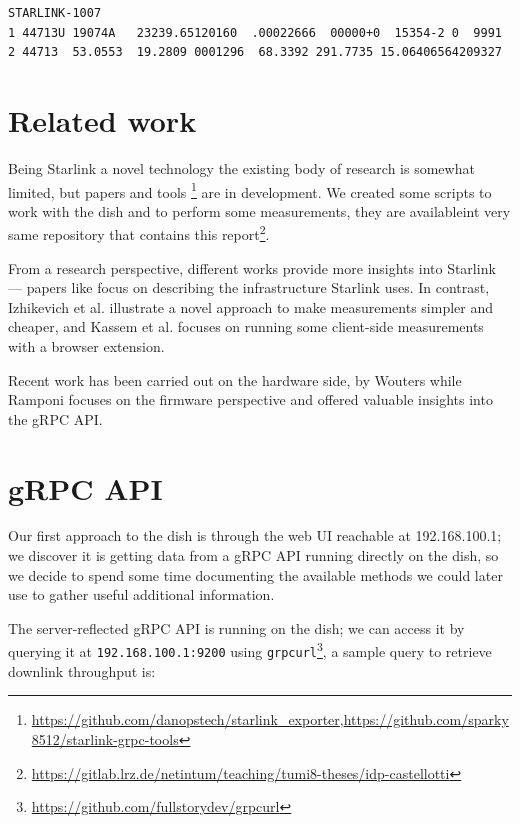 \documentclass[IN,11pt,twoside,openright,idp,english]{tumthesis}
\begin{document}
\begin{lstlisting}[caption={TLE for satellite STARLINK-1007 },captionpos=b]
STARLINK-1007           
1 44713U 19074A   23239.65120160  .00022666  00000+0  15354-2 0  9991
2 44713  53.0553  19.2809 0001296  68.3392 291.7735 15.06406564209327
\end{lstlisting}
    
\section{Related work}
    
Being Starlink a novel technology the existing body of research is somewhat limited, but papers and tools
\footnote{\url{https://github.com/danopstech/starlink\_exporter},\url{https://github.com/sparky8512/starlink-grpc-tools}}
are in development. We created some scripts to work with the dish and to perform some measurements, they are
availableint very same repository that contains this
report\footnote{\url{https://gitlab.lrz.de/netintum/teaching/tumi8-theses/idp-castellotti}}.
    
From a research perspective, different works provide more insights into Starlink — papers like \cite{pan2023measuring}
focus on describing the infrastructure Starlink uses. In contrast, Izhikevich et al. \cite{izhikevich2023democratizing}
illustrate a novel approach to make measurements simpler and cheaper, and Kassem et al.\cite{browser-side} focuses on
running some client-side measurements with a browser extension.
    
Recent work has been carried out on the hardware side, by Wouters \cite{glitching} while Ramponi \cite{quarkslab}
focuses on the firmware perspective and offered valuable insights into the gRPC API.
    
\section{gRPC API}
    
Our first approach to the dish is through the web UI reachable at 192.168.100.1; we discover it is getting data from a
gRPC API running directly on the dish, so we decide to spend some time documenting the available methods we could later
use to gather useful additional information.
    
The server-reflected gRPC API is running on the dish; we can access it by querying it at \texttt{192.168.100.1:9200}
using \texttt{grpcurl}\footnote{\url{https://github.com/fullstorydev/grpcurl}}, a sample query to retrieve downlink
throughput is:
    
\end{document}

